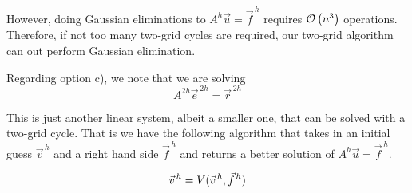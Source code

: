 \vspace{2em}

However, doing Gaussian eliminations to $A^h\vec{u} = \vec{f}^{\,h}$ requires
$\mathcal{O}\left(n^3\right)$ operations. Therefore, if not too many two-grid cycles are required,
our two-grid algorithm can out perform Gaussian elimination.

Regarding option c), we note that we are solving
\begin{equation*}
A^{2h}\vec{e}^{\,2h} = \vec{r}^{\,2h}
\end{equation*}

This is just another linear system, albeit a smaller one, that can be solved
with a two-grid cycle. That is we have the following algorithm that takes in an
initial guess $\vec{v}^{\,h}$ and a right hand side $\vec{f}^{\,h}$ and returns
a better solution of $A^h\vec{u} = \vec{f}^{\,h}$.

\vspace{2em}
\begin{equation*}
\tikzmark{vh}\vec{v}^{\,h} = \tikzmark{V}V(\tikzmark{vhguess}\vec{v}^{\,h}, \tikzmark{fh}\vec{f}^{\,h})
\end{equation*}

{
\color{red}

}
\vspace{2em}

